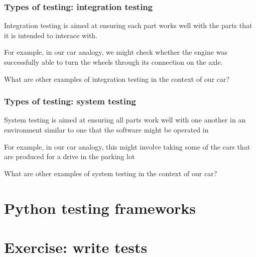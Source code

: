 \documentclass[10pt]{beamer}
\begin{document}
  \begin{frame} \frametitle{Types of testing: integration testing}

    Integration testing is aimed at ensuring each part works well with the parts that
    it is intended to interace with.

    \vspace{0.25cm}

    For example, in our car analogy, we might check whether the engine was successfully
    able to turn the wheels through its connection on the axle.

    \vspace{0.25cm}

    What are other examples of integration testing in the context of our car?

  \end{frame}

  \begin{frame} \frametitle{Types of testing: system testing}

    System testing is aimed at ensuring all parts work well with one another in an
    environment similar to one that the software might be operated in

    \vspace{0.25cm}

    For example, in our car analogy, this might involve taking some of the cars that
    are produced for a drive in the parking lot

    \vspace{0.25cm}

    What are other examples of system testing in the context of our car?

  \end{frame}


\section{Python testing frameworks}


\section{Exercise: write tests}
\end{document}
